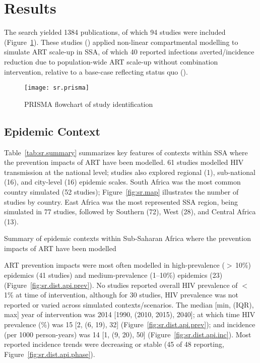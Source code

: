 \section{Results}\label{sr.res}
The search yielded 1384 publications,
of which 94 studies were included (Figure~\ref{fig:sr.prisma}).
These studies ()
applied non-linear compartmental modelling to simulate ART scale-up in SSA,
of which 40 reported infections averted/incidence reduction
due to population-wide ART scale-up without combination intervention,
relative to a base-case reflecting status quo ().
\begin{figure}
  \centering
  \texttt{[image: sr.prisma]}
  \caption{PRISMA flowchart of study identification}
  \label{fig:sr.prisma}
\end{figure}
\subsection{Epidemic Context}\label{sr.res.context}
Table~\ref{tab:sr.summary} summarizes key features of contexts within SSA
where the prevention impacts of ART have been modelled.
61 studies modelled HIV transmission at the national level;
studies also explored
regional (1), sub-national (16), and city-level (16) epidemic scales.
South Africa was the most common country simulated (52 studies);
Figure~\ref{fig:sr.map} illustrates the number of studies by country.
East Africa was the most represented SSA region, being simulated in 77 studies,
followed by Southern (72), West (28), and Central Africa (13).
\begin{table}
  \centering
  \caption{Summary of epidemic contexts within Sub-Saharan Africa where
    the prevention impacts of ART have been modelled}
  \label{tab:sr.summary}
  
\end{table}
\par
ART prevention impacts were most often modelled in
high-prevalence ({$>$\,10\%}) epidemics (41 studies) and
medium-prevalence ({1--10\%}) epidemics (23) (Figure~\ref{fig:sr.dist.api.prev}).
No studies reported overall HIV prevalence of {$<$\,1\%} at time of intervention,
although for 30 studies, HIV prevalence was
not reported or varied across simulated contexts/scenarios.
The median [min, (IQR), max] year of intervention was 2014 [1990, (2010, 2015), 2040]; at which time
HIV prevalence (\%) was 15 [2, (6, 19), 32] (Figure~\ref{fig:sr.dist.api.prev}); and
incidence (per 1000 person-years) was 14 [1, (9, 20), 50] (Figure~\ref{fig:sr.dist.api.inc}).
Most reported incidence trends were decreasing or stable
(45 of 48 reporting, Figure~\ref{fig:sr.dist.api.phase}).
